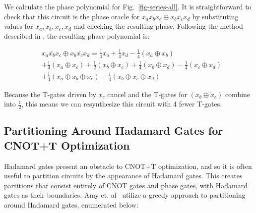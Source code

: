 \begin{example}
  \label{ex-series}
  We calculate the phase polynomial for Fig.~\ref{fig-series-all}. It is straightforward
  to check that this circuit is the phase oracle for $x_a \bar{x_b} x_c \oplus x_b \bar{x_c} x_d$ by
  substituting values for $x_a,x_b,x_c,x_d$ and checking the resulting phase. Following the method described in
  , the resulting phase polynomial is:

  \begin{equation}
    \label{eq-series}
    \begin{aligned}
      &x_a \bar{x_b} x_c \oplus x_b \bar{x_c} x_d = \frac{1}{4}x_a + \frac{1}{4}x_d
      - \frac{1}{4}(x_a \oplus x_b) \\
      & + \frac{1}{4}(x_a \oplus x_c) + \frac{1}{2}(x_b \oplus x_c)
      + \frac{1}{4}(x_b \oplus x_d) -\frac{1}{4}(x_c \oplus x_d)     \\
      &+ \frac{1}{4}(x_a \oplus x_b \oplus x_c) - \frac{1}{4}(x_b \oplus x_c \oplus x_d) 
    \end{aligned}
  \end{equation}
  
  Because the T-gates driven by $x_c$ cancel and the T-gates for $(x_b \oplus x_c)$ combine into $\frac{1}{2}$,
  this means we can resynthesize this circuit with 4 fewer T-gates.
\end{example}


\subsection{Partitioning Around Hadamard Gates for CNOT+T Optimization}
\label{Mot:tdepth}

Hadamard gates present an obstacle to CNOT+T optimization, and so it is often useful
to partition circuits by the appearance of Hadamard gates. This creates partitions that
consist entirely of CNOT gates and phase gates, with Hadamard gates as their boundaries.
Amy et. al~\cite{bib-amy-matroid} utilize a greedy approach to partitioning around Hadamard
gates, enumerated below:

